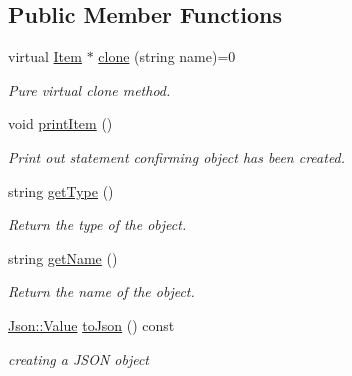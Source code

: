 \subsection*{Public Member Functions}
\begin{DoxyCompactItemize}
\item 
\hypertarget{class_item_aee86b49539ec0027b06b5c703e386de8}{}virtual \hyperlink{class_item}{Item} $\ast$ \hyperlink{class_item_aee86b49539ec0027b06b5c703e386de8}{clone} (string name)=0\label{class_item_aee86b49539ec0027b06b5c703e386de8}

\begin{DoxyCompactList}\small\item\em Pure virtual clone method. \end{DoxyCompactList}\item 
\hypertarget{class_item_ad3c548eb69bdb99ccbe41bdad8e4eb41}{}void \hyperlink{class_item_ad3c548eb69bdb99ccbe41bdad8e4eb41}{print\+Item} ()\label{class_item_ad3c548eb69bdb99ccbe41bdad8e4eb41}

\begin{DoxyCompactList}\small\item\em Print out statement confirming object has been created. \end{DoxyCompactList}\item 
\hypertarget{class_item_a2aea1cc560205b01eaf5250c21f4fc71}{}string \hyperlink{class_item_a2aea1cc560205b01eaf5250c21f4fc71}{get\+Type} ()\label{class_item_a2aea1cc560205b01eaf5250c21f4fc71}

\begin{DoxyCompactList}\small\item\em Return the type of the object. \end{DoxyCompactList}\item 
\hypertarget{class_item_a63d7f2148b699e539aae354b01559811}{}string \hyperlink{class_item_a63d7f2148b699e539aae354b01559811}{get\+Name} ()\label{class_item_a63d7f2148b699e539aae354b01559811}

\begin{DoxyCompactList}\small\item\em Return the name of the object. \end{DoxyCompactList}\item 
\hypertarget{class_item_a70ce365b03e94a33d4a137dcd9fa2818}{}\hyperlink{class_json_1_1_value}{Json\+::\+Value} \hyperlink{class_item_a70ce365b03e94a33d4a137dcd9fa2818}{to\+Json} () const \label{class_item_a70ce365b03e94a33d4a137dcd9fa2818}

\begin{DoxyCompactList}\small\item\em creating a J\+S\+O\+N object \end{DoxyCompactList}\end{DoxyCompactItemize}
